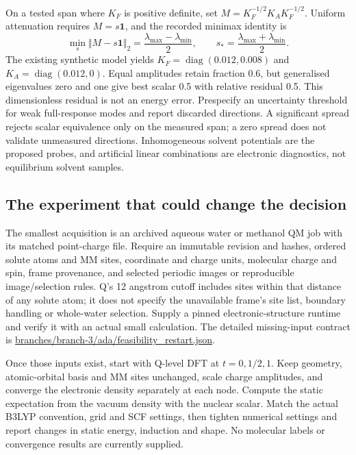 \documentclass{article}
\begin{document}
On a tested span where $K_F$ is positive definite, set $M=K_F^{-1/2}K_AK_F^{-1/2}$. Uniform attenuation requires $M=s\mathbf{1}$, and the recorded minimax identity is
\begin{equation*}
\min_s\Vert M-s\mathbf{1}\Vert_2
=\frac{\lambda_{\max}-\lambda_{\min}}{2},\qquad
s_*=\frac{\lambda_{\max}+\lambda_{\min}}{2}.
\end{equation*}
The existing synthetic model yields $K_F=\operatorname{diag}(0.012,0.008)$ and $K_A=\operatorname{diag}(0.012,0)$. Equal amplitudes retain fraction 0.6, but generalised eigenvalues zero and one give best scalar 0.5 with relative residual 0.5. This dimensionless residual is not an energy error. Prespecify an uncertainty threshold for weak full-response modes and report discarded directions. A significant spread rejects scalar equivalence only on the measured span; a zero spread does not validate unmeasured directions. Inhomogeneous solvent potentials are the proposed probes, and artificial linear combinations are electronic diagnostics, not equilibrium solvent samples.

\subsection{The experiment that could change the decision}

The smallest acquisition is an archived aqueous water or methanol QM job with its matched point-charge file. Require an immutable revision and hashes, ordered solute atoms and MM sites, coordinate and charge units, molecular charge and spin, frame provenance, and selected periodic images or reproducible image/selection rules. Q's 12 angstrom cutoff includes sites within that distance of any solute atom; it does not specify the unavailable frame's site list, boundary handling or whole-water selection. Supply a pinned electronic-structure runtime and verify it with an actual small calculation. The detailed missing-input contract is \url{branches/branch-3/ada/feasibility_restart.json}.

Once those inputs exist, start with Q-level DFT at $t=0,1/2,1$. Keep geometry, atomic-orbital basis and MM sites unchanged, scale charge amplitudes, and converge the electronic density separately at each node. Compute the static expectation from the vacuum density with the nuclear scalar. Match the actual B3LYP convention, grid and SCF settings, then tighten numerical settings and report changes in static energy, induction and shape. No molecular labels or convergence results are currently supplied.
\end{document}
